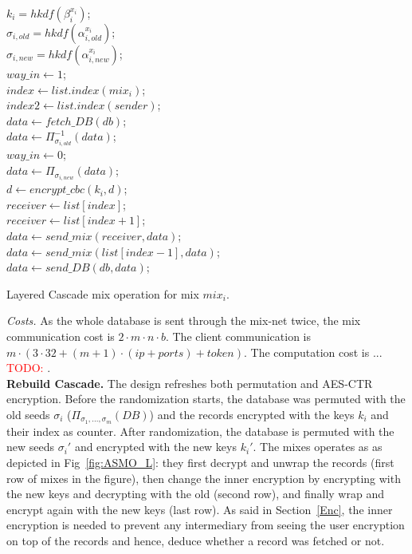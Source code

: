 \documentclass[USenglish,oneside,twocolumn]{article}
\newcommand{\todo}[1]{\textcolor{red}{TODO: #1}}
\begin{document}
\begin{algorithm}
\DontPrintSemicolon
{}
$k_i=hkdf(\beta_{i}^{x_i})$;\\
$\sigma_{i,old}=hkdf(\alpha_{i,old}^{x_i})$;\\
$\sigma_{i,new}=hkdf(\alpha_{i, new}^{x_i})$;\\
$way\_in \gets 1$;\\
$index \gets list.index(mix_i)$;\\
$index2 \gets list.index(sender)$;\\
{
{
$data \gets fetch\_DB(db)$;\\
}
$data \gets \Pi_{\sigma_{i,old}}^{-1}(data)$;\\
}
\Else
{
$way\_in\gets 0$;\\
$data \gets \Pi_{\sigma_{i,new}}(data)$;\\
}
{
	$d \gets encrypt\_cbc(k_i, d)$;\\
}
{
$receiver \gets list[index]$;\\
{
$receiver \gets list[index+1]$;\\
}
$data \gets send\_mix(receiver, data)$;\\
}
\Else
{
{
$data \gets send\_mix(list[index-1], data)$;\\
}
\Else
{
$data \gets send\_DB(db, data)$;\\
}
}
\caption{Layered Cascade mix operation for mix $mix_i$.}
\label{alg:CIL}
\end{algorithm}

\noindent\textit{Costs.}
As the whole database is sent through the mix-net twice, the mix communication cost is $2\cdot m \cdot n \cdot b$. The client communication is $m \cdot (3 \cdot 32+ (m+1)\cdot (ip +ports)+ token)$.
The computation cost is ... \todo{}.\\


\noindent\textbf{Rebuild Cascade.} The design refreshes both permutation and AES-CTR encryption. Before the randomization starts, the database was permuted with the old seeds $\sigma_i$ ($\Pi_{\sigma_1,...,\sigma_m}\left ( DB \right )$) and the records encrypted with the keys $k_i$ and their index as counter. After randomization, the database is permuted with the new seeds $\sigma_i'$ and encrypted with the new keys $k_i'$.
The mixes operates as as depicted in Fig~\ref{fig:ASMO_L}: they first decrypt and unwrap the records (first row of mixes in the figure), then change the inner encryption by encrypting with the new keys and decrypting with the old (second row), and finally wrap and encrypt again with the new keys (last row). As said in Section~\ref{Enc}, the inner encryption is needed to prevent any intermediary from seeing the user encryption on top of the records and hence, deduce whether a record was fetched or not. 
\end{document}
